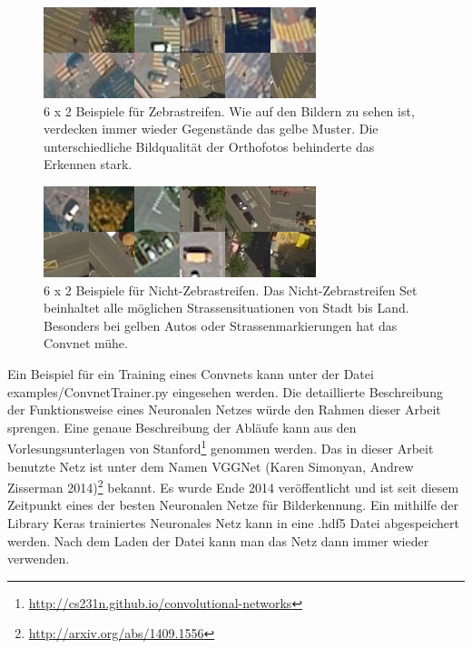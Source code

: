 \begin{figure}[H]
	\centering
	\includegraphics{images/Zebrastreifen_examples.png}
	\caption[Beispiele für Zebrastreifen]{6 x 2 Beispiele für Zebrastreifen. Wie auf den Bildern zu sehen ist, verdecken immer wieder Gegenstände das gelbe Muster. Die unterschiedliche Bildqualität der Orthofotos behinderte das Erkennen stark.}
\end{figure}

\begin{figure}[H]
	\centering
	\includegraphics{images/No_Zebrastreifen_examples.png}
	\caption[Beispiele für Nicht-Zebrastreife]{6 x 2 Beispiele für Nicht-Zebrastreifen. Das Nicht-Zebrastreifen Set beinhaltet alle möglichen Strassensituationen von Stadt bis Land. Besonders bei gelben Autos oder Strassenmarkierungen hat das Convnet mühe.}
\end{figure}

Ein Beispiel für ein Training eines Convnets kann unter der Datei examples/ConvnetTrainer.py eingesehen werden. Die detaillierte Beschreibung der Funktionsweise eines Neuronalen Netzes würde den Rahmen dieser Arbeit sprengen. Eine genaue Beschreibung der Abläufe kann aus den Vorlesungsunterlagen von Stanford\footnote{\url{http://cs231n.github.io/convolutional-networks}} genommen werden. Das in dieser Arbeit benutzte Netz ist unter dem Namen VGGNet (Karen Simonyan, Andrew Zisserman 2014)\footnote{\url{http://arxiv.org/abs/1409.1556}} bekannt. Es wurde Ende 2014 veröffentlicht und ist seit diesem Zeitpunkt eines der besten Neuronalen Netze für Bilderkennung. Ein mithilfe der Library Keras trainiertes Neuronales Netz kann in eine .hdf5 Datei abgespeichert werden. Nach dem Laden der Datei kann man das Netz dann immer wieder verwenden.

